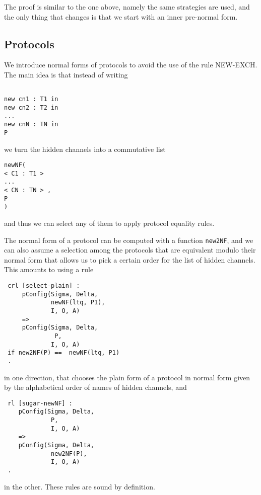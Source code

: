 \documentclass{article}
\begin{document}
The proof is similar to the one above, namely the same strategies are used, and the only thing that changes is that we start with an inner pre-normal form.

\subsection{Protocols}

We introduce normal forms of protocols to avoid the use of the rule NEW-EXCH. 
The main idea is that instead of writing 
\begin{lstlisting}

new cn1 : T1 in 
new cn2 : T2 in
...
new cnN : TN in
P

\end{lstlisting}

\noindent we turn the hidden channels into a commutative list
 \begin{lstlisting}
newNF(
< C1 : T1 >
...
< CN : TN > ,
P
)
\end{lstlisting}
\noindent and thus we can select any of them to apply protocol equality rules.

The normal form of a protocol can be computed 
with a function \verb+new2NF+, and we can also
assume a selection among the protocols that are equivalent modulo their normal
form that allows us to pick a certain order for the list of hidden channels.
This amounts to using a rule
\begin{lstlisting}
 crl [select-plain] :
     pConfig(Sigma, Delta, 
             newNF(ltq, P1), 
             I, O, A)
     =>
     pConfig(Sigma, Delta, 
              P, 
             I, O, A) 
 if new2NF(P) ==  newNF(ltq, P1)           
 .
\end{lstlisting}
\noindent in one direction, that chooses the plain form of a protocol in normal form given by the alphabetical order of names of hidden channels, and 
\begin{lstlisting}  
 rl [sugar-newNF] :
    pConfig(Sigma, Delta,  
             P, 
             I, O, A)
    => 
    pConfig(Sigma, Delta, 
             new2NF(P), 
             I, O, A) 
 . 
 \end{lstlisting}
\noindent in the other. These rules are sound by definition.
\end{document}
